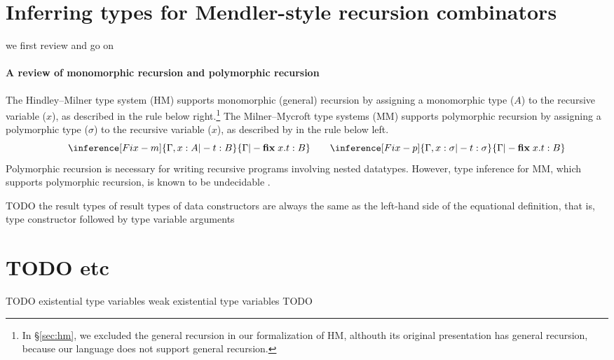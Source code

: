 \section{Inferring types for Mendler-style recursion combinators}
\label{sec:naxTyInfer:rec}
we first review and go on

\paragraph{A review of monomorphic recursion and polymorphic recursion}
The Hindley--Milner type system (HM) \cite{DamMil82} supports
monomorphic (general) recursion by assigning a monomorphic type ($A$)
to the recursive variable ($x$), as described in the rule 
below right.\footnote{
	In \S\ref{sec:hm}, we excluded the general recursion in
	our formalization of HM, althouth its original presentation
	has general recursion, because our language does not support
	general recursion.}
The Milner--Mycroft type systems (MM) \cite{Myc84} supports
polymorphic recursion by assigning a polymorphic type ($\sigma$)
to the recursive variable ($x$), as described by in the rule 
below left.
\[
\qquad
\inference[\sc Fix-m]{\Gamma,x:A |- t : B}{
	\Gamma |- \textbf{fix}\;x.t : B}
\qquad
\inference[\sc Fix-p]{\Gamma,x:\sigma |- t : \sigma}{
	\Gamma |- \textbf{fix}\;x.t : B}
\]
Polymorphic recursion is necessary for writing recursive programs involving
nested datatypes. However, type inference for MM, which supports polymorphic
recursion, is known to be undecidable \cite{Hen93}.

TODO
the result types of 
result types of data constructors are always the same as the left-hand side
of the equational definition, that is, type constructor followed by
type variable arguments

\section{TODO etc}
\label{sec:naxTyInfer:etc}
TODO
existential type variables
weak existential type variables
TODO

